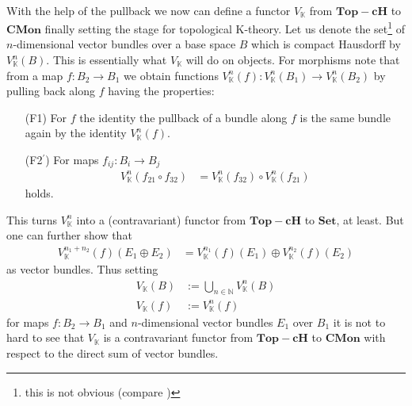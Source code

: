 \\
With the help of the pullback we now can define a functor $V_{\mathbb{K}}$ from $\mathbf{Top-cH}$ to $\mathbf{CMon}$ finally setting the stage for topological K-theory. Let us denote the set\footnote{this is not obvious (compare \cite{7fc005ba})} of $n$-dimensional vector bundles over a base space $B$ which is compact Hausdorff by $V_{\mathbb{K}}^{n}(B)$. This is essentially what $V_{\mathbb{K}}$ will do on objects. For morphisms note that from a map $f \colon B_{2} \to B_{1}$ we obtain functions $V_{\mathbb{K}}^{n}(f) \colon V_{\mathbb{K}}^{n}(B_{1}) \to V_{\mathbb{K}}^{n}(B_{2})$ by pulling back along $f$ having the properties:
\begin{enumerate}
\item[(F1)]
For $f$ the identity the pullback of a bundle along $f$ is the same bundle again by the identity $V_{\mathbb{K}}^{n}(f)$.
\item[(F2$^{\prime}$)]
For maps $f_{ij} \colon B_{i} \to B_{j}$
\begin{align*}
  V_{\mathbb{K}}^{n}(f_{21} \circ f_{32})
  &=
  V_{\mathbb{K}}^{n}(f_{32})
  \circ
  V_{\mathbb{K}}^{n}(f_{21})
\end{align*}
holds.
\end{enumerate}
This turns $V_{\mathbb{K}}^{n}$ into a (contravariant) functor from $\mathbf{Top-cH}$ to $\mathbf{Set}$, at least. But one can further show that
\begin{align*}
  V_{\mathbb{K}}^{n_{1}+n_{2}}(f)(E_{1} \oplus E_{2})
  &=
  V_{\mathbb{K}}^{n_{1}}(f)(E_{1})
  \oplus
  V_{\mathbb{K}}^{n_{2}}(f)(E_{2})
\end{align*}
as vector bundles. Thus setting
\begin{align*}
  V_{\mathbb{K}}(B)
  &:=
  \bigcup_{n \in \mathbb{N}}
  V_{\mathbb{K}}^{n}(B)
  \\
  V_{\mathbb{K}}(f)
  &:=
  V_{\mathbb{K}}^{n}(f)
\end{align*}
for maps $f \colon B_{2} \to B_{1}$ and $n$-dimensional vector bundles $E_{1}$ over $B_{1}$ it is not to hard to see that $V_{\mathbb{K}}$ is a contravariant functor from $\mathbf{Top-cH}$ to $\mathbf{CMon}$ with respect to the direct sum of vector bundles.
